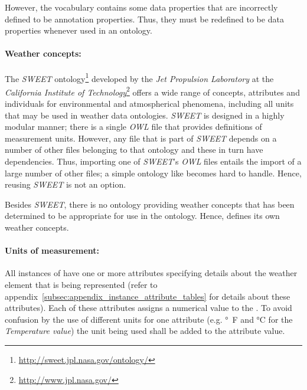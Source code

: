 However, the vocabulary contains some data properties that are incorrectly defined to be annotation properties. Thus, they must be redefined to be data properties whenever used in an ontology.

\paragraph{Weather concepts:}

The \emph{SWEET} ontology\cite{SWEET}\footnote{\href{http://sweet.jpl.nasa.gov/ontology/}{http://sweet.jpl.nasa.gov/ontology/}} developed by the \emph{Jet Propulsion Laboratory} at the \emph{California Institute of Technology}\footnote{\href{http://www.jpl.nasa.gov/}{http://www.jpl.nasa.gov/}} offers a wide range of concepts, attributes and individuals for environmental and atmospherical phenomena, including all units that may be used in weather data ontologies. \emph{SWEET} is designed in a highly modular manner; there is a single \emph{OWL} file that provides definitions of measurement units. However, any file that is part of \emph{SWEET} depends on a number of other files belonging to that ontology and these in turn have dependencies. Thus, importing one of \emph{SWEET}'s \emph{OWL} files entails the import of a large number of other files; a simple ontology like \thinkhomeweather becomes hard to handle. Hence, reusing \emph{SWEET} is not an option.

Besides \emph{SWEET}, there is no ontology providing weather concepts that has been determined to be appropriate for use in the \thinkhomeweather ontology. Hence, \thinkhomeweather defines its own weather concepts.

\paragraph{Units of measurement:}

\newcommand{\muo}{\emph{MUO}}

All instances of  have one or more attributes specifying details about the weather element that is being represented (refer to appendix~\ref{subsec:appendix_instance_attribute_tables} for details about these attributes). Each of these attributes assigns a numerical value to the . To avoid confusion by the use of different units for one attribute (e.g. \si{\degree F} and \si{\celsius} for the \emph{Temperature value}) the unit being used shall be added to the attribute value.

